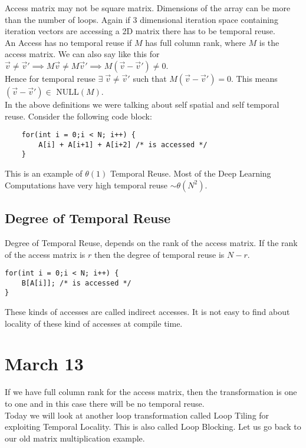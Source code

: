 \documentclass{article}
\begin{document}
Access matrix may not be square matrix. Dimensions of the array can be more than the number of loops. Again if 3 dimensional iteration space containing iteration vectors are accessing a 2D matrix there has to be temporal reuse. \\  

An Access has no temporal reuse if $M$ has full column rank, where $M$ is the access matrix. We can also say like this for $\vec{v} \neq \vec{v}' \implies M\vec{v} \neq M\vec{v}' \implies M(\vec{v} - \vec{v}') \neq 0$. \\
Hence for temporal reuse $\exists \; \vec{v} \neq \vec{v}'$ such that $M(\vec{v} - \vec{v}') = 0$. This means $(\vec{v} - \vec{v}') \in$ NULL$(M)$. \\

In the above definitions we were talking about self spatial and self temporal reuse. Consider the following code block:
\begin{lstlisting}
    for(int i = 0;i < N; i++) {
        A[i] + A[i+1] + A[i+2] /* is accessed */
    }
\end{lstlisting}
This is an example of $\theta(1)$ Temporal Reuse. Most of the Deep Learning Computations have very high temporal reuse $\sim \theta(N^2)$. \\

\subsection*{Degree of Temporal Reuse}
Degree of Temporal Reuse, depends on the rank of the access matrix. If the rank of the access matrix is $r$ then the degree of temporal reuse is $N-r$. \\

\begin{lstlisting}
for(int i = 0;i < N; i++) {
    B[A[i]]; /* is accessed */
}
\end{lstlisting}

These kinds of accesses are called indirect accesses. It is not easy to find about locality of these kind of accesses at compile time. \\

\section*{March 13}
If we have full column rank for the access matrix, then the transformation is one to one and in this case there will be no temporal reuse. \\
Today we will look at another loop transformation called Loop Tiling for exploiting Temporal Locality. This is also called Loop Blocking. Let us go back to our old matrix multiplication example. \\
\end{document}
